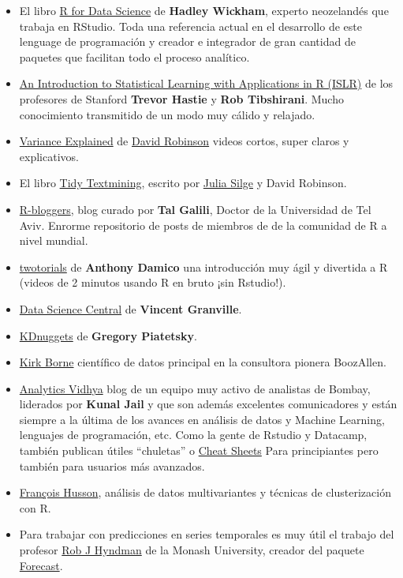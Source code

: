 \documentclass[]{book}
\theoremstyle{definition}
\theoremstyle{definition}
\theoremstyle{definition}
\theoremstyle{remark}
\begin{document}
\begin{itemize}
\item
  El libro \href{https://r4ds.had.co.nz/}{R for Data Science} de
  \textbf{Hadley Wickham}, experto neozelandés que trabaja en RStudio.
  Toda una referencia actual en el desarrollo de este lenguage de
  programación y creador e integrador de gran cantidad de paquetes que
  facilitan todo el proceso analítico.
\item
  \href{https://www-bcf.usc.edu/\%7Egareth/ISL/}{An Introduction to
  Statistical Learning with Applications in R (ISLR)} de los profesores
  de Stanford \textbf{Trevor Hastie} y \textbf{Rob Tibshirani}. Mucho
  conocimiento transmitido de un modo muy cálido y relajado.
\item
  \href{http://varianceexplained.org/RData/}{Variance Explained} de
  \href{https://twitter.com/drob}{David Robinson} videos cortos, super
  claros y explicativos.
\item
  El libro \href{http://tidytextmining.com/intro.html}{Tidy Textmining},
  escrito por \href{https://juliasilge.com/}{Julia Silge} y David
  Robinson.
\item
  \href{https://www.r-bloggers.com}{R-bloggers}, blog curado por
  \textbf{Tal Galili}, Doctor de la Universidad de Tel Aviv. Enrorme
  repositorio de posts de miembros de de la comunidad de R a nivel
  mundial.
\item
  \href{https://www.twotorials.com/}{twotorials} de \textbf{Anthony
  Damico} una introducción muy ágil y divertida a R (videos de 2 minutos
  usando R en bruto ¡sin Rstudio!).
\item
  \href{http://www.datasciencecentral.com}{Data Science Central} de
  \textbf{Vincent Granville}.
\item
  \href{http://www.kdnuggets.com/}{KDnuggets} de \textbf{Gregory
  Piatetsky}.
\item
  \href{http://kirkborne.net/}{Kirk Borne} científico de datos principal
  en la consultora pionera BoozAllen.
\item
  \href{https://www.analyticsvidhya.com}{Analytics Vidhya} blog de un
  equipo muy activo de analistas de Bombay, liderados por \textbf{Kunal
  Jail} y que son además excelentes comunicadores y están siempre a la
  última de los avances en análisis de datos y Machine Learning,
  lenguajes de programación, etc. Como la gente de Rstudio y Datacamp,
  también publican útiles ``chuletas'' o
  \href{https://www.analyticsvidhya.com/blog/2017/02/top-28-cheat-sheets-for-machine-learning-data-science-probability-sql-big-data/}{Cheat
  Sheets} Para principiantes pero también para usuarios más avanzados.
\item
  \href{http://math.agrocampus-ouest.fr/infoglueDeliverLive/membres/Francois.Husson}{François
  Husson}, análisis de datos multivariantes y técnicas de clusterización
  con R.
\item
  Para trabajar con predicciones en series temporales es muy útil el
  trabajo del profesor \href{https://www.otexts.org/fpp}{Rob J Hyndman}
  de la Monash University, creador del paquete
  \href{http://robjhyndman.com/software/forecast/\%22}{Forecast}.
\end{itemize}
\end{document}
